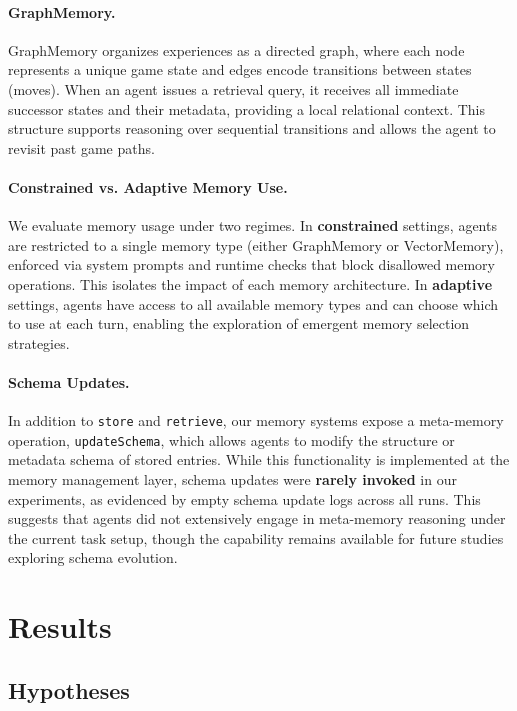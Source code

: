 \documentclass[10pt]{article}
\begin{document}
\paragraph{GraphMemory.}
GraphMemory organizes experiences as a directed graph, where each node represents a unique game state and edges encode transitions between states (moves). When an agent issues a retrieval query, it receives all immediate successor states and their metadata, providing a local relational context. This structure supports reasoning over sequential transitions and allows the agent to revisit past game paths.

\paragraph{Constrained vs. Adaptive Memory Use.}
We evaluate memory usage under two regimes. In \textbf{constrained} settings, agents are restricted to a single memory type (either GraphMemory or VectorMemory), enforced via system prompts and runtime checks that block disallowed memory operations. This isolates the impact of each memory architecture. In \textbf{adaptive} settings, agents have access to all available memory types and can choose which to use at each turn, enabling the exploration of emergent memory selection strategies.

\paragraph{Schema Updates.} 
In addition to \texttt{store} and \texttt{retrieve}, our memory systems expose a meta-memory operation, \texttt{updateSchema}, which allows agents to modify the structure or metadata schema of stored entries. While this functionality is implemented at the memory management layer, schema updates were \textbf{rarely invoked} in our experiments, as evidenced by empty schema update logs across all runs. This suggests that agents did not extensively engage in meta-memory reasoning under the current task setup, though the capability remains available for future studies exploring schema evolution.\\

\section{Results}

\subsection{Hypotheses}
\end{document}
